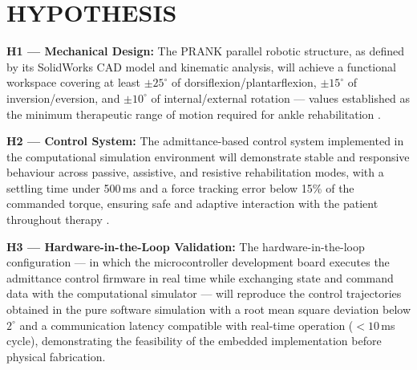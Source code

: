 \chapter{HYPOTHESIS}\label{hypothesis}

\textbf{H1 — Mechanical Design:}\label{H1}
The PRANK parallel robotic structure, as defined by its SolidWorks CAD model and kinematic analysis, will achieve a functional workspace covering at least $\pm25^{\circ}$ of dorsiflexion/plantarflexion, $\pm15^{\circ}$ of inversion/eversion, and $\pm10^{\circ}$ of internal/external rotation — values established as the minimum therapeutic range of motion required for ankle rehabilitation \cite{Brockett2016, Tsoi2009}.

\textbf{H2 — Control System:}\label{H2}
The admittance-based control system implemented in the computational simulation environment will demonstrate stable and responsive behaviour across passive, assistive, and resistive rehabilitation modes, with a settling time under 500\,ms and a force tracking error below 15\% of the commanded torque, ensuring safe and adaptive interaction with the patient throughout therapy \cite{Zhang2018, Li2020passive}.

\textbf{H3 — Hardware-in-the-Loop Validation:}\label{H3}
The hardware-in-the-loop configuration — in which the microcontroller development board executes the admittance control firmware in real time while exchanging state and command data with the computational simulator — will reproduce the control trajectories obtained in the pure software simulation with a root mean square deviation below $2^{\circ}$ and a communication latency compatible with real-time operation ($<10$\,ms cycle), demonstrating the feasibility of the embedded implementation before physical fabrication.
